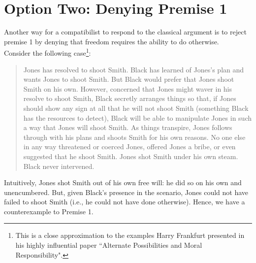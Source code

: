 \documentclass[11pt]{article}
\theoremstyle{definition}
\begin{document}
\section*{Option Two: Denying Premise 1}

Another way for a compatibilist to respond to the classical argument is to reject premise 1 by denying that freedom requires the ability to do otherwise. \\

\noindent
Consider the following case\footnote{This is a close approximation to the examples Harry Frankfurt presented in his highly influential paper ``Alternate Possibilities and Moral Responsibility".}:

\begin{quote}
Jones has resolved to shoot Smith. Black has learned of Jones’s plan and wants Jones to shoot Smith. But Black would prefer that Jones shoot Smith on his own. However, concerned that Jones might waver in his resolve to shoot Smith, Black secretly arranges things so that, if Jones should show any sign at all that he will not shoot Smith (something Black has the resources to detect), Black will be able to manipulate Jones in such a way that Jones will shoot Smith. As things transpire, Jones follows through with his plans and shoots Smith for his own reasons. No one else in any way threatened or coerced Jones, offered Jones a bribe, or even suggested that he shoot Smith. Jones shot Smith under his own steam. Black never intervened.
\end{quote}

Intuitively, Jones shot Smith out of his own free will: he did so on his own and unencumbered. But, given Black’s presence in the scenario, Jones could not have failed to shoot Smith (i.e., he could not have done otherwise). Hence, we have a counterexample to Premise 1.
\end{document}
